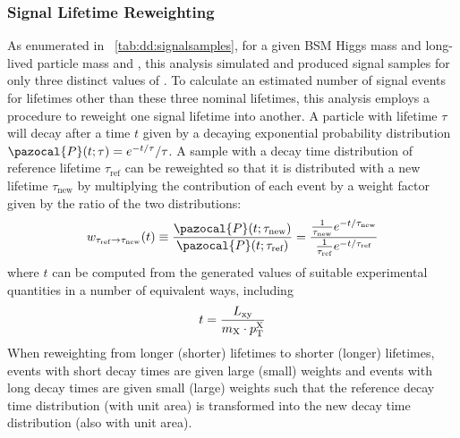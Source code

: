\subsubsection{Signal Lifetime Reweighting}
\label{sec:dd:lifetimereweighting}
As enumerated in \Tab~\ref{tab:dd:signalsamples}, for a given BSM Higgs mass and long-lived particle mass \mH and \mX, this analysis simulated and produced signal samples for only three distinct values of \cTau.
To calculate an estimated number of signal events for lifetimes other than these three nominal lifetimes, this analysis employs a procedure to reweight one signal lifetime into another.
A particle with lifetime $\tau$ will decay after a time $t$ given by a decaying exponential probability distribution $\pazocal{P}(t; \tau) = e^{-t/\tau}/\tau$.
A sample with a decay time distribution of reference lifetime $\tau_\text{ref}$ can be reweighted so that it is distributed with a new lifetime $\tau_\text{new}$ by multiplying the contribution of each event by a weight factor given by the ratio of the two distributions:
\begin{equation}
  w_{\tau_\text{ref}\to\tau_\text{new}}(t) \equiv \frac{\pazocal{P}(t; \tau_\text{new})}{\pazocal{P}(t; \tau_\text{ref})} = \frac{\frac{1}{\tau_\text{new}}e^{-t/\tau_\text{new}}}{\frac{1}{\tau_\text{ref}}e^{-t/\tau_\text{ref}}}
  \label{eq:dd:lifetimereweight}
\end{equation}
where $t$ can be computed from the generated values of suitable experimental quantities in a number of equivalent ways, including
\begin{equation}
  t = \frac{L_{\mathrm{xy}}}{m_{\mathrm{X}} \cdot p_{\mathrm{T}}^{\mathrm{X}}}
  \label{eq:dd:decaytime}
\end{equation}
When reweighting from longer (shorter) lifetimes to shorter (longer) lifetimes, events with short decay times are given large (small) weights and events with long decay times are given small (large) weights such that the reference decay time distribution (with unit area) is transformed into the new decay time distribution (also with unit area).

